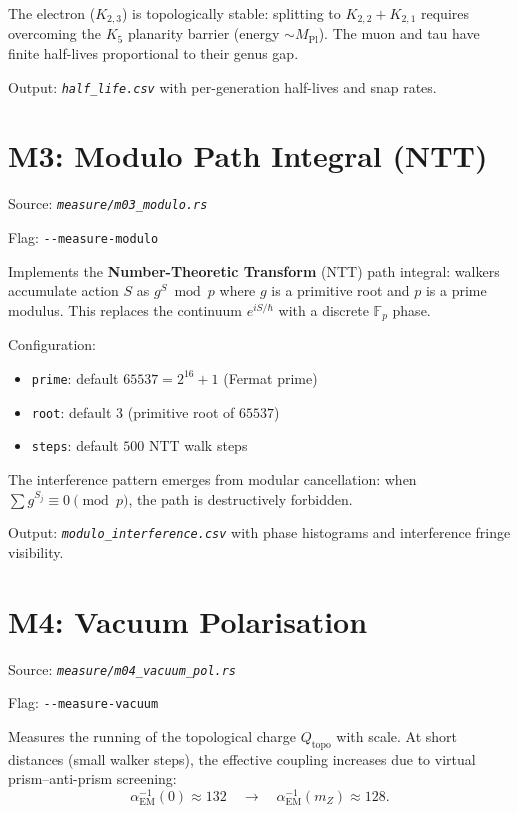 \documentclass[11pt, a4paper, openany]{book}
\newcommand{\code}[1]{\texttt{#1}}
\newcommand{\flag}[1]{\texttt{-{}-#1}}
\newcommand{\file}[1]{\texttt{\itshape #1}}
\begin{document}
\begin{result}
  The electron ($K_{2,3}$) is topologically stable: splitting to $K_{2,2} +
  K_{2,1}$ requires overcoming the $K_5$ planarity barrier (energy $\sim M_{\text{Pl}}$).
  The muon and tau have finite half-lives proportional to their genus gap.
\end{result}

Output: \file{half\_life.csv} with per-generation half-lives and snap rates.

\section{M3: Modulo Path Integral (NTT)}

Source: \file{measure/m03\_modulo.rs}

Flag: \flag{measure-modulo}

Implements the \textbf{Number-Theoretic Transform} (NTT) path integral: walkers
accumulate action $S$ as $g^S \bmod p$ where $g$ is a primitive root and $p$ is
a prime modulus.  This replaces the continuum $e^{iS/\hbar}$ with a discrete
$\mathbb{F}_p$ phase.

Configuration:
\begin{itemize}
  \item \code{prime}: default $65537 = 2^{16} + 1$ (Fermat prime)
  \item \code{root}: default $3$ (primitive root of $65537$)
  \item \code{steps}: default $500$ NTT walk steps
\end{itemize}

The interference pattern emerges from modular cancellation: when $\sum g^{S_j}
\equiv 0 \pmod{p}$, the path is destructively forbidden.

Output: \file{modulo\_interference.csv} with phase histograms and interference fringe
visibility.

\section{M4: Vacuum Polarisation}

Source: \file{measure/m04\_vacuum\_pol.rs}

Flag: \flag{measure-vacuum}

Measures the running of the topological charge $Q_{\text{topo}}$ with scale.
At short distances (small walker steps), the effective coupling increases
due to virtual prism--anti-prism screening:
\[
  \alpha_{\text{EM}}^{-1}(0) \approx 132 \quad \to \quad
  \alpha_{\text{EM}}^{-1}(m_Z) \approx 128.
\]
\end{document}
